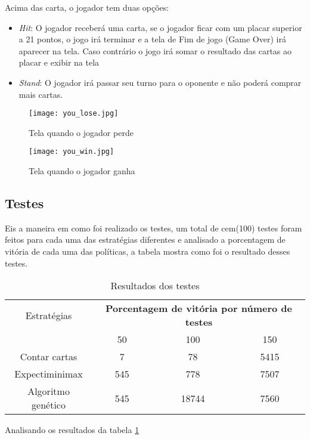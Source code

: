 Acima das carta, o jogador tem duas opções:
\begin{itemize}
    \item \emph{Hit}: O jogador receberá uma carta, se o jogador ficar com um 
    placar superior a 21 pontos, o jogo irá terminar e a tela de Fim de jogo (Game Over)
    irá aparecer na tela. Caso contrário o jogo irá somar o resultado das cartas ao placar 
    e exibir na tela 
    \item \emph{Stand}: O jogador irá passar seu turno para o oponente e não poderá 
    comprar mais cartas.
\end{itemize}

\begin{figure}[ht] 
    \centering
    \texttt{[image: you\_lose.jpg]}
    \caption{Tela quando o jogador perde}
    \label{fig:you_lose}
\end{figure}

\begin{figure}[ht] 
    \centering
    \texttt{[image: you\_win.jpg]}
    \caption{Tela quando o jogador ganha}
    \label{fig:you_win}
\end{figure}

\subsection{Testes}

Eis a maneira em como foi realizado os testes, um total de cem(100) testes 
foram feitos para cada uma das estratégias diferentes e analisado a
porcentagem de vitória de cada uma das políticas, a tabela mostra como foi 
o resultado desses testes.

\begin{table}[htbp]
    \centering
    \caption{Resultados dos testes}
    \begin{tabular}{|c | c | c | c|} 
        \hline
        Estratégias & \multicolumn{3}{|c|}{\textbf{Porcentagem de vitória por número de testes}} \\ 
        \cline{2-4} 
          & 50 & 100 & 150 \\ 
        \hline
        Contar cartas  & 7 & 78 & 5415 \\
        \hline
        Expectiminimax & 545 & 778 & 7507 \\
        \hline
        Algoritmo genético & 545 & 18744 & 7560 \\
        \hline
    \end{tabular}
    \label{tab:results}
\end{table}

Analisando os resultados da tabela \ref{tab:results}


